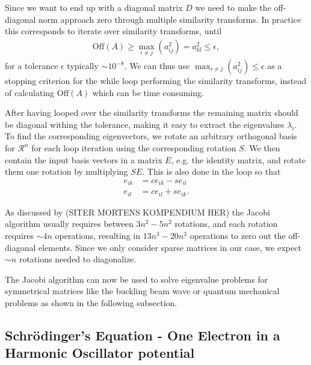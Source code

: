\documentclass[twocolumn]{aastex62}
\begin{document}
Since we want to end up with a diagonal matrix $D$ we need to make the off-diagonal norm approach zero through multiple similarity transforms. In practice this corresponds to iterate over similarity transforms, until 
\begin{align}
\text{Off}(A) \geq \max_{i\neq j}(a_{ij}^2) = a_{kl}^2 \leq \epsilon,
\end{align}
for a tolerance $\epsilon$ typically $\sim 10^{-8}$. We can thus use 
$\max_{i\neq j}(a_{ij}^2)\leq \epsilon$ as a stopping criterion for the while loop performing the similarity transforms, instead of calculating $\text{Off}(A)$ which can be time consuming.

After having looped over the similarity transforms the remaining matrix should be diagonal withing the tolerance, making it easy to extract the eigenvalues $\lambda_i$. To find the corresponding eigenvectors, we rotate an arbitrary orthogonal basis for $\mathcal{R}^n$ for each loop iteration using the corresponding rotation $S$. We then contain the input basis vectors in a matrix $E$, e.g. the identity matrix, and rotate them one rotation by multiplying $SE$. This is also done in the loop so that 
\begin{align}
	e_{ik} &= ce_{ik} - se_{il}\\
	e_{il} &= ce_{il} + se_{ik}.
\end{align}

As discussed by (SITER MORTENS KOMPENDIUM HER) the Jacobi algorithm usually requires between $3n^2-5n^2$ rotations, and each rotation requires $\sim 4n$ operations, resulting in $13n^3-20n^3$ operations to zero out the off-diagonal elements. Since we only consider sparse matrices in our case, we expect $\sim n$ rotations needed to diagonalize. 

The Jacobi algorithm can now be used to solve eigenvalue problems for symmetrical matrices like the buckling beam wave or quantum mechanical problems as shown in the following subsection. 

\subsection{Schrödinger's Equation - One Electron in a Harmonic Oscillator potential}
\end{document}
